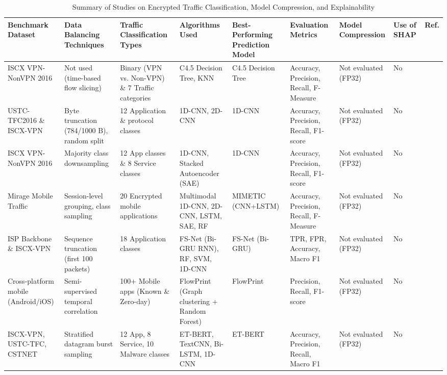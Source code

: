 \documentclass[conference]{IEEEtran}
\begin{document}
\begin{table}[htbp]
\caption{Summary of Studies on Encrypted Traffic Classification, Model Compression, and Explainability}
\label{tab:related_work}
\centering
\scriptsize
\setlength{\tabcolsep}{3.5pt}
\begin{tabular}{p{2.2cm}p{2.0cm}p{2.1cm}p{2.4cm}p{2.0cm}p{2.2cm}p{1.9cm}p{1.4cm}c}
\toprule
\textbf{Benchmark Dataset} & \textbf{Data Balancing Techniques} & \textbf{Traffic Classification Types} & \textbf{Algorithms Used} & \textbf{Best-Performing Prediction Model} & \textbf{Evaluation Metrics} & \textbf{Model Compression} & \textbf{Use of SHAP} & \textbf{Ref.} \\
\midrule
ISCX VPN-NonVPN 2016 & Not used (time-based flow slicing) & Binary (VPN vs. Non-VPN) \& 7 Traffic categories & C4.5 Decision Tree, KNN & C4.5 Decision Tree & Accuracy, Precision, Recall, F-Measure & Not evaluated (FP32) & No & \cite{b1} \\
\addlinespace[2pt]
USTC-TFC2016 \& ISCX-VPN & Byte truncation (784/1000 B), random split & 12 Application \& protocol classes & 1D-CNN, 2D-CNN & 1D-CNN & Accuracy, Precision, Recall, F1-score & Not evaluated (FP32) & No & \cite{b2} \\
\addlinespace[2pt]
ISCX VPN-NonVPN 2016 & Majority class downsampling & 12 App classes \& 8 Service classes & 1D-CNN, Stacked Autoencoder (SAE) & 1D-CNN & Accuracy, Precision, Recall, F1-score & Not evaluated (FP32) & No & \cite{b3} \\
\addlinespace[2pt]
Mirage Mobile Traffic & Session-level grouping, class sampling & 20 Encrypted mobile applications & Multimodal 1D-CNN, 2D-CNN, LSTM, SAE, RF & MIMETIC (CNN+LSTM) & Accuracy, Precision, Recall, F-Measure & Not evaluated (FP32) & No & \cite{b10} \\
\addlinespace[2pt]
ISP Backbone \& ISCX-VPN & Sequence truncation (first 100 packets) & 18 Application classes & FS-Net (Bi-GRU RNN), RF, SVM, 1D-CNN & FS-Net (Bi-GRU) & TPR, FPR, Accuracy, Macro F1 & Not evaluated (FP32) & No & \cite{b11} \\
\addlinespace[2pt]
Cross-platform mobile (Android/iOS) & Semi-supervised temporal correlation & 100+ Mobile apps (Known \& Zero-day) & FlowPrint (Graph clustering + Random Forest) & FlowPrint & Precision, Recall, F1-score & Not evaluated (FP32) & No & \cite{b12} \\
\addlinespace[2pt]
ISCX-VPN, USTC-TFC, CSTNET & Stratified datagram burst sampling & 12 App, 8 Service, 10 Malware classes & ET-BERT, TextCNN, Bi-LSTM, 1D-CNN & ET-BERT & Accuracy, Precision, Recall, Macro F1 & Not evaluated (FP32) & No & \cite{b13} \\

\end{tabular}
\end{table}
\end{document}
